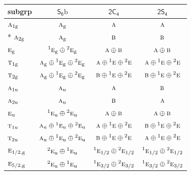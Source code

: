 \documentclass[10pt,a4paper]{article}
\numberwithin{equation}{section}
\newcommand{\grp}[1]{\mathsf{#1}}
\newcommand{\irr}[1]{\text{\normalfont\scshape #1}}
\newcommand{\conjpair}[1]{{}^{#1}}
\newcommand{\ptag}[1]{\mathrm{#1}}
\newcommand{\secondclass}{\mathrm{b}}
\begin{document}
{\small\begin{longtable}{@{}lccc@{}}\toprule
subgrp & \href{S6b.pdf}{$\grp{S_{6}}\secondclass$} & \href{2C4.pdf}{$\grp{2C_{4}}$} & \href{2S4.pdf}{$\grp{2S_{4}}$}\\\midrule\endhead
\bottomrule\endfoot\endlastfoot
$\irr{a}_{1\ptag{g}}$ & $\irr{a}_{\ptag{g}}$ & $\irr{a}$ & $\irr{a}$\\*
$\irr{a}_{2\ptag{g}}$ & $\irr{a}_{\ptag{g}}$ & $\irr{b}$ & $\irr{b}$\\
$\irr{e}_{\ptag{g}}$ & $\conjpair{1}\irr{e}_{\ptag{g}}\oplus \conjpair{2}\irr{e}_{\ptag{g}}$ & $\irr{a}\oplus \irr{b}$ & $\irr{a}\oplus \irr{b}$\\
$\irr{t}_{1\ptag{g}}$ & $\irr{a}_{\ptag{g}}\oplus \conjpair{1}\irr{e}_{\ptag{g}}\oplus \conjpair{2}\irr{e}_{\ptag{g}}$ & $\irr{a}\oplus \conjpair{1}\irr{e}\oplus \conjpair{2}\irr{e}$ & $\irr{a}\oplus \conjpair{1}\irr{e}\oplus \conjpair{2}\irr{e}$\\
$\irr{t}_{2\ptag{g}}$ & $\irr{a}_{\ptag{g}}\oplus \conjpair{1}\irr{e}_{\ptag{g}}\oplus \conjpair{2}\irr{e}_{\ptag{g}}$ & $\irr{b}\oplus \conjpair{1}\irr{e}\oplus \conjpair{2}\irr{e}$ & $\irr{b}\oplus \conjpair{1}\irr{e}\oplus \conjpair{2}\irr{e}$\\
$\irr{a}_{1\ptag{u}}$ & $\irr{a}_{\ptag{u}}$ & $\irr{a}$ & $\irr{b}$\\
$\irr{a}_{2\ptag{u}}$ & $\irr{a}_{\ptag{u}}$ & $\irr{b}$ & $\irr{a}$\\
$\irr{e}_{\ptag{u}}$ & $\conjpair{1}\irr{e}_{\ptag{u}}\oplus \conjpair{2}\irr{e}_{\ptag{u}}$ & $\irr{a}\oplus \irr{b}$ & $\irr{a}\oplus \irr{b}$\\
$\irr{t}_{1\ptag{u}}$ & $\irr{a}_{\ptag{u}}\oplus \conjpair{1}\irr{e}_{\ptag{u}}\oplus \conjpair{2}\irr{e}_{\ptag{u}}$ & $\irr{a}\oplus \conjpair{1}\irr{e}\oplus \conjpair{2}\irr{e}$ & $\irr{b}\oplus \conjpair{1}\irr{e}\oplus \conjpair{2}\irr{e}$\\
$\irr{t}_{2\ptag{u}}$ & $\irr{a}_{\ptag{u}}\oplus \conjpair{1}\irr{e}_{\ptag{u}}\oplus \conjpair{2}\irr{e}_{\ptag{u}}$ & $\irr{b}\oplus \conjpair{1}\irr{e}\oplus \conjpair{2}\irr{e}$ & $\irr{a}\oplus \conjpair{1}\irr{e}\oplus \conjpair{2}\irr{e}$\\
$\irr{e}_{1/2,\ptag{g}}$ & $\conjpair{2}\irr{e}_{\ptag{u}}\oplus \conjpair{1}\irr{e}_{\ptag{u}}$ & $\conjpair{1}\irr{e}_{1/2}\oplus \conjpair{2}\irr{e}_{1/2}$ & $\conjpair{1}\irr{e}_{1/2}\oplus \conjpair{2}\irr{e}_{1/2}$\\
$\irr{e}_{5/2,\ptag{g}}$ & $\conjpair{2}\irr{e}_{\ptag{u}}\oplus \conjpair{1}\irr{e}_{\ptag{u}}$ & $\conjpair{1}\irr{e}_{3/2}\oplus \conjpair{2}\irr{e}_{3/2}$ & $\conjpair{1}\irr{e}_{3/2}\oplus \conjpair{2}\irr{e}_{3/2}$\\

\end{longtable}}
\end{document}
